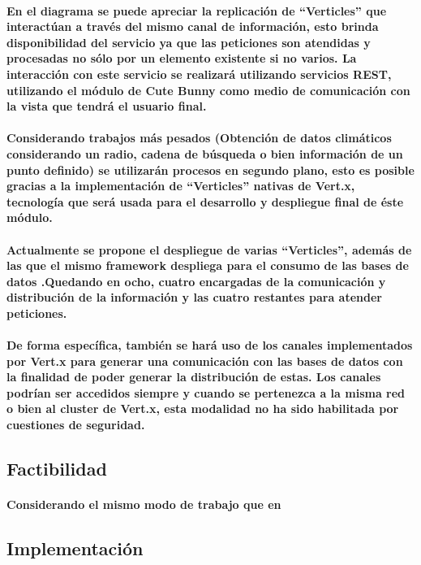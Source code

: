     \paragraph{En el diagrama se puede apreciar la replicación de ``Verticles'' que interactúan a través del mismo canal de información, esto brinda disponibilidad del servicio ya que las peticiones son atendidas y procesadas no sólo por un elemento existente si no varios. La interacción con este servicio se realizará utilizando servicios REST, utilizando el módulo de Cute Bunny como medio de comunicación con la vista que tendrá el usuario final.}
    \paragraph{Considerando trabajos más pesados (Obtención de datos climáticos considerando un radio, cadena de búsqueda o bien información de un punto definido) se utilizarán procesos en segundo plano, esto es posible gracias a la implementación de ``Verticles'' nativas de Vert.x, tecnología que será usada para el desarrollo y despliegue final de éste módulo.}
    \paragraph{Actualmente se propone el despliegue de varias ``Verticles'', además de las que el mismo framework despliega para el consumo de las bases de datos \cite{33}.Quedando en ocho, cuatro encargadas de la comunicación y distribución de la información y las cuatro restantes para atender peticiones.} 
    \paragraph{De forma específica, también se hará uso de los canales implementados por Vert.x para generar una comunicación con las bases de datos con la finalidad de poder generar la distribución de estas. Los canales podrían ser accedidos siempre y cuando se pertenezca a la misma red o bien al cluster de Vert.x, esta modalidad no ha sido habilitada por cuestiones de seguridad.}
  \subsection{Factibilidad} 
    \paragraph{Considerando el mismo modo de trabajo que en }
  \subsection{Implementación}
